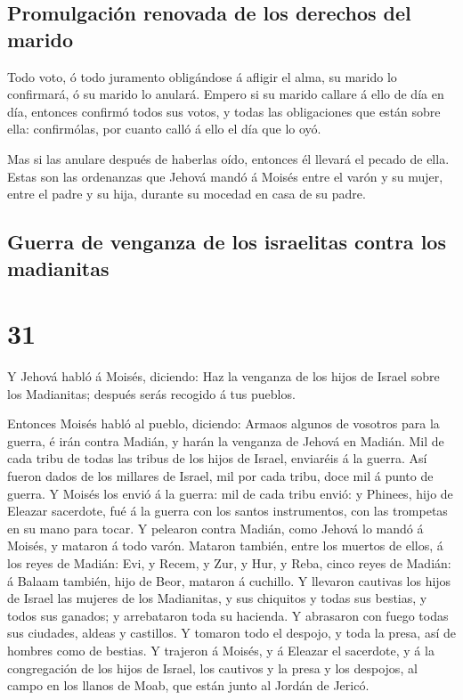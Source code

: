 \hypertarget{promulgaciuxf3n-renovada-de-los-derechos-del-marido}{%
\subsection{Promulgación renovada de los derechos del
marido}\label{promulgaciuxf3n-renovada-de-los-derechos-del-marido}}

 Todo voto, ó todo juramento obligándose á afligir el
alma, su marido lo confirmará, ó su marido lo anulará. 
Empero si su marido callare á ello de día en día, entonces confirmó
todos sus votos, y todas las obligaciones que están sobre ella:
confirmólas, por cuanto calló á ello el día que lo oyó.

 Mas si las anulare después de haberlas oído, entonces él
llevará el pecado de ella. Estas son las ordenanzas que Jehová mandó á
Moisés entre el varón y su mujer, entre el padre y su hija, durante su
mocedad en casa de su padre.

\hypertarget{guerra-de-venganza-de-los-israelitas-contra-los-madianitas}{%
\subsection{Guerra de venganza de los israelitas contra los
madianitas}\label{guerra-de-venganza-de-los-israelitas-contra-los-madianitas}}

\hypertarget{section-04-31}{%
\section{31}\label{section-04-31}}

 Y Jehová habló á Moisés, diciendo:  Haz la
venganza de los hijos de Israel sobre los Madianitas; después serás
recogido á tus pueblos.

 Entonces Moisés habló al pueblo, diciendo: Armaos algunos
de vosotros para la guerra, é irán contra Madián, y harán la venganza de
Jehová en Madián.  Mil de cada tribu de todas las tribus
de los hijos de Israel, enviaréis á la guerra.  Así fueron
dados de los millares de Israel, mil por cada tribu, doce mil á punto de
guerra.  Y Moisés los envió á la guerra: mil de cada tribu
envió: y Phinees, hijo de Eleazar sacerdote, fué á la guerra con los
santos instrumentos, con las trompetas en su mano para tocar.
 Y pelearon contra Madián, como Jehová lo mandó á Moisés,
y mataron á todo varón.  Mataron también, entre los
muertos de ellos, á los reyes de Madián: Evi, y Recem, y Zur, y Hur, y
Reba, cinco reyes de Madián: á Balaam también, hijo de Beor, mataron á
cuchillo.  Y llevaron cautivas los hijos de Israel las
mujeres de los Madianitas, y sus chiquitos y todas sus bestias, y todos
sus ganados; y arrebataron toda su hacienda.  Y abrasaron
con fuego todas sus ciudades, aldeas y castillos.  Y
tomaron todo el despojo, y toda la presa, así de hombres como de
bestias.  Y trajeron á Moisés, y á Eleazar el sacerdote,
y á la congregación de los hijos de Israel, los cautivos y la presa y
los despojos, al campo en los llanos de Moab, que están junto al Jordán
de Jericó.

